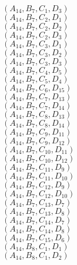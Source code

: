 \documentclass[14pt]{article}
\begin{document}
    $({A}_{14}, {B}_{7}, {C}_{1}, {D}_{3}) $ \\ 
    $({A}_{14}, {B}_{7}, {C}_{2}, {D}_{1}) $ \\ 
    $({A}_{14}, {B}_{7}, {C}_{2}, {D}_{2}) $ \\ 
    $({A}_{14}, {B}_{7}, {C}_{2}, {D}_{3}) $ \\ 
    $({A}_{14}, {B}_{7}, {C}_{3}, {D}_{1}) $ \\ 
    $({A}_{14}, {B}_{7}, {C}_{3}, {D}_{2}) $ \\ 
    $({A}_{14}, {B}_{7}, {C}_{3}, {D}_{3}) $ \\ 
    $({A}_{14}, {B}_{7}, {C}_{4}, {D}_{5}) $ \\ 
    $({A}_{14}, {B}_{7}, {C}_{5}, {D}_{4}) $ \\ 
    $({A}_{14}, {B}_{7}, {C}_{6}, {D}_{15}) $ \\ 
    $({A}_{14}, {B}_{7}, {C}_{7}, {D}_{13}) $ \\ 
    $({A}_{14}, {B}_{7}, {C}_{7}, {D}_{14}) $ \\ 
    $({A}_{14}, {B}_{7}, {C}_{8}, {D}_{13}) $ \\ 
    $({A}_{14}, {B}_{7}, {C}_{8}, {D}_{14}) $ \\ 
    $({A}_{14}, {B}_{7}, {C}_{9}, {D}_{11}) $ \\ 
    $({A}_{14}, {B}_{7}, {C}_{9}, {D}_{12}) $ \\ 
    $({A}_{14}, {B}_{7}, {C}_{10}, {D}_{11}) $ \\ 
    $({A}_{14}, {B}_{7}, {C}_{10}, {D}_{12}) $ \\ 
    $({A}_{14}, {B}_{7}, {C}_{11}, {D}_{9}) $ \\ 
    $({A}_{14}, {B}_{7}, {C}_{11}, {D}_{10}) $ \\ 
    $({A}_{14}, {B}_{7}, {C}_{12}, {D}_{9}) $ \\ 
    $({A}_{14}, {B}_{7}, {C}_{12}, {D}_{10}) $ \\ 
    $({A}_{14}, {B}_{7}, {C}_{13}, {D}_{7}) $ \\ 
    $({A}_{14}, {B}_{7}, {C}_{13}, {D}_{8}) $ \\ 
    $({A}_{14}, {B}_{7}, {C}_{14}, {D}_{7}) $ \\ 
    $({A}_{14}, {B}_{7}, {C}_{14}, {D}_{8}) $ \\ 
    $({A}_{14}, {B}_{7}, {C}_{15}, {D}_{6}) $ \\ 
    $({A}_{14}, {B}_{8}, {C}_{1}, {D}_{1}) $ \\ 
    $({A}_{14}, {B}_{8}, {C}_{1}, {D}_{2}) $ \\ 
\end{document}
